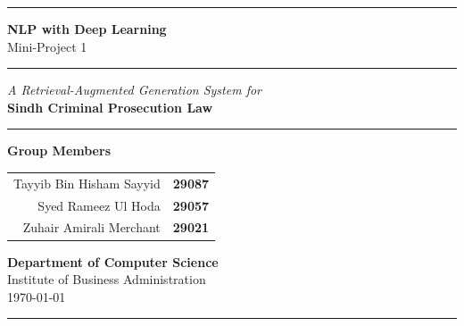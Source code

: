 \documentclass[11pt,a4paper]{article}
\begin{document}
\begin{titlepage}
    \centering
    \vspace*{1.5cm}

    {\color{coverblue}\rule{\textwidth}{1.5pt}}
    \vspace{1.2cm}

    {\Huge\bfseries NLP with Deep Learning}\\[0.3em]
    {\Large Mini-Project 1}

    \vspace{1.0cm}
    {\color{coverblue}\rule{0.6\textwidth}{0.6pt}}
    \vspace{1.2cm}

    {\LARGE\itshape A Retrieval-Augmented Generation System for}\\[0.4em]
    {\LARGE\bfseries Sindh Criminal Prosecution Law}

    \vspace{1.8cm}
    {\color{coverblue}\rule{0.3\textwidth}{0.4pt}}
    \vspace{1.2cm}

    {\Large\bfseries Group Members}\\[1.0em]
    {\large
        \begin{tabular}{rl}
            Tayyib Bin Hisham Sayyid & \textbf{29087}\\[0.4em]
            Syed Rameez Ul Hoda      & \textbf{29057}\\[0.4em]
            Zuhair Amirali Merchant  & \textbf{29021}\\
        \end{tabular}
    }

    \vfill

    {\large\bfseries Department of Computer Science}\\[0.4em]
    {\large Institute of Business Administration}\\[1.2em]
    {\large\today}

    \vspace{0.6cm}
    {\color{coverblue}\rule{\textwidth}{1.5pt}}
\end{titlepage}
\end{document}
